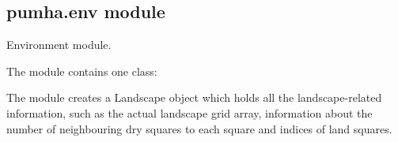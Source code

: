 \documentclass[letterpaper,10pt,english]{sphinxmanual}
\begin{document}
\subsection{pumha.env module}
\label{\detokenize{pumha:pumha-env-module}}\label{\detokenize{pumha:module-pumha.env}}
Environment module.

The module contains one class:

\begin{sphinxVerbatim}[commandchars=\\\{\}]
\end{sphinxVerbatim}

The module creates a Landscape object which holds all the landscape-related
information, such as the actual landscape grid array, information about
the number of neighbouring dry squares to each square and indices of land
squares.
\end{document}
